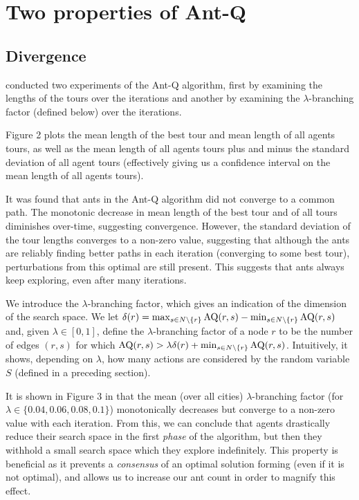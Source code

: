 \section{Two properties of Ant-Q}

\subsection{Divergence}

\textcite{gambardella1995ant} conducted two experiments of the Ant-Q algorithm, first by examining the lengths of the tours over the iterations and another by examining the $\lambda$-branching factor (defined below) over the iterations. 

Figure 2 plots the mean length of the best tour and mean length of all agents tours, as well as the mean length of all agents tours plus and minus the standard deviation of all agent tours (effectively giving us a confidence interval on the mean length of all agents tours).

It was found that ants in the Ant-Q algorithm did not converge to a common path. The monotonic decrease in mean length of the best tour and of all tours diminishes over-time, suggesting convergence. However, the standard deviation of the tour lengths converges to a non-zero value, suggesting that although the ants are reliably finding better paths in each iteration (converging to some best tour), perturbations from this optimal are still present. This suggests that ants always keep exploring, even after many iterations.

We introduce the $\lambda$-branching factor, which gives an indication of the dimension of the search space. We let $\delta(r) = \max_{s \in N \setminus \{r\}} \operatorname{AQ}(r, s) - \min_{s \in N \setminus \{r\}} \operatorname{AQ}(r, s)$ and, given $\lambda \in [0,1]$, define the $\lambda$-branching factor of a node $r$ to be the number of edges $(r,s)$ for which $\operatorname{AQ}(r,s) > \lambda \delta(r) + \min_{s \in N \setminus \{r\}} \operatorname{AQ}(r, s)$. Intuitively, it shows, depending on $\lambda$, how many actions are considered by the random variable $S$ (defined in a preceding section).

It is shown in Figure 3 in \cite{gambardella1995ant} that the mean (over all cities) $\lambda$-branching factor (for $\lambda \in \{0.04, 0.06, 0.08, 0.1\}$) monotonically decreases but converge to a non-zero value with each iteration. From this, we can conclude that agents drastically reduce their search space in the first \emph{phase} of the algorithm, but then they withhold a small search space which they explore indefinitely. This property is beneficial as it prevents a \emph{consensus} of an optimal solution forming (even if it is not optimal), and allows us to increase our ant count in order to magnify this effect. 

